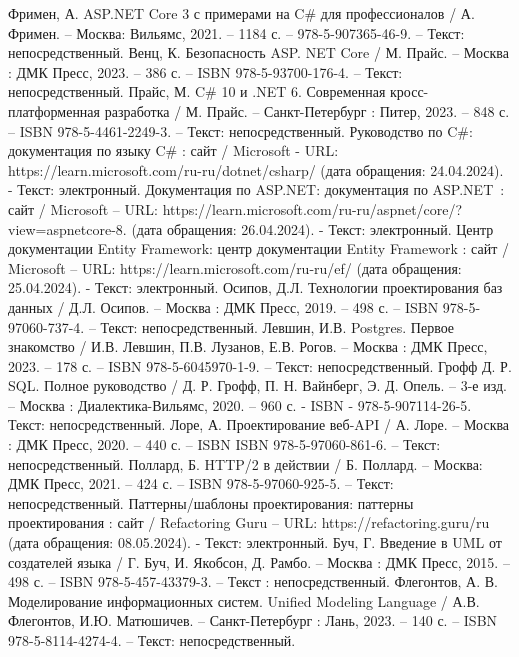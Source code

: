 
\begin{thebibliography}{20}
	 Фримен, А. ASP.NET Core 3 с примерами на C\# для профессионалов / А. Фримен. – Москва: Вильямс, 2021. – 1184 с. – 978-5-907365-46-9. – Текст: непосредственный.
	 Венц, К. Безопасность ASP. NET Core / М. Прайс. – Москва : ДМК Пресс, 2023. – 386 с. – ISBN 978-5-93700-176-4. – Текст: непосредственный.
	 Прайс, М. C\# 10 и .NET 6. Современная кросс-платформенная разработка / М. Прайс. – Санкт-Петербург : Питер, 2023. – 848 с. – ISBN 978-5-4461-2249-3. – Текст: непосредственный.
	 Руководство по C\#: документация по языку C\# : сайт / Microsoft - URL: https://learn.microsoft.com/ru-ru/dotnet/csharp/ (дата обращения: 24.04.2024). - Текст: электронный.
	 Документация по ASP.NET: документация по ASP.NET~: сайт / Microsoft – URL: https://learn.microsoft.com/ru-ru/aspnet/core/?view=aspnetcore-8. (дата обращения: 26.04.2024). - Текст: электронный.
	 Центр документации Entity Framework: центр документации Entity Framework : сайт / Microsoft – URL: https://learn.microsoft.com/ru-ru/ef/ (дата обращения: 25.04.2024). - Текст: электронный.
	 Осипов, Д.Л. Технологии проектирования баз данных / Д.Л. Осипов. – Москва : ДМК Пресс, 2019. – 498 с. – ISBN 978-5-97060-737-4. – Текст: непосредственный.
	 Левшин, И.В. Postgres. Первое знакомство / И.В. Левшин, П.В. Лузанов, Е.В. Рогов. – Москва : ДМК Пресс, 2023. – 178 с. – ISBN 978-5-6045970-1-9. – Текст: непосредственный.
	 Грофф Д. Р. SQL. Полное руководство / Д. Р. Грофф, П. Н. Вайнберг, Э. Д. Опель. – 3-е изд. – Москва : Диалектика-Вильямс, 2020. – 960 с. - ISBN - 978-5-907114-26-5. Текст: непосредственный.
	 Лоре, А. Проектирование веб-API / А. Лоре. – Москва : ДМК Пресс, 2020. – 440 с. – ISBN ISBN 978-5-97060-861-6. – Текст: непосредственный.
	 Поллард, Б. HTTP/2 в действии / Б. Поллард. – Москва: ДМК Пресс, 2021. – 424 с. – ISBN 978-5-97060-925-5. – Текст: непосредственный.
	 Паттерны/шаблоны проектирования: паттерны проектирования : сайт / Refactoring Guru – URL: https://refactoring.guru/ru (дата обращения: 08.05.2024). - Текст: электронный.
	 Буч, Г. Введение в UML от создателей языка / Г. Буч, И. Якобсон, Д. Рамбо. – Москва : ДМК Пресс, 2015. – 498 с. – ISBN 978-5-457-43379-3. – Текст : непосредственный.
	 Флегонтов, А. В. Моделирование информационных систем. Unified Modeling Language / А.В. Флегонтов, И.Ю. Матюшичев. – Санкт-Петербург : Лань, 2023. – 140 с. – ISBN 978-5-8114-4274-4. – Текст: непосредственный.

\end{thebibliography}
